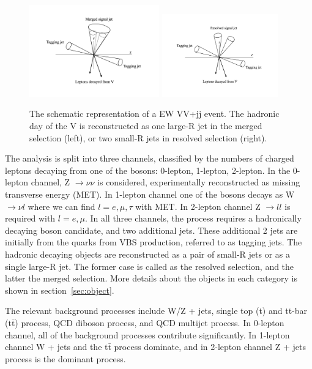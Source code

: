 \begin{figure}[H]
\begin{center}
 \includegraphics[width=0.50\textwidth,keepaspectratio]{figures/VBStopologyMerged}
 \includegraphics[width=0.45\textwidth,keepaspectratio]{figures/VBStopologyResolved}
\caption{
The schematic representation of a EW VV+jj event. The hadronic day of the V is reconstructed as one large-R jet in the merged selection (left), or two small-R jets in resolved selection (right).
}
\label{fig:VBStopology}
\end{center}
\end{figure}

The analysis is split into three channels, classified by the numbers of charged leptons decaying from one of the bosons: 0-lepton, 1-lepton, 2-lepton. 
In the 0-lepton channel, Z $\rightarrow \nu \nu$ is considered, experimentally reconstructed as missing transverse energy (MET). In 1-lepton channel one of the bosons decays as W $\rightarrow \nu l$ where we can find $l = e, \mu, \tau$ with MET. In 2-lepton channel Z $\rightarrow l l$ is required with $l = e, \mu$. 
In all three channels, the process requires a hadronically decaying boson candidate, and two additional jets. 
These additional 2 jets are initially from the quarks from VBS production, referred to as tagging jets. The hadronic decaying objects are reconstructed as a pair of small-R jets or as a single large-R jet. The former case is called as the resolved selection, and the latter the merged selection. More details about the objects in each category is shown in section~\ref{sec:object}.

The relevant background processes include W/Z + jets, single top (t) and tt-bar (t$\bar{\mathrm{t}}$) process, QCD diboson process, and QCD multijet process.
In 0-lepton channel, all of the background processes contribute significantly. In 1-lepton channel W + jets and the t$\bar{\mathrm{t}}$ process dominate, and in 2-lepton channel Z + jets process is the dominant process.

